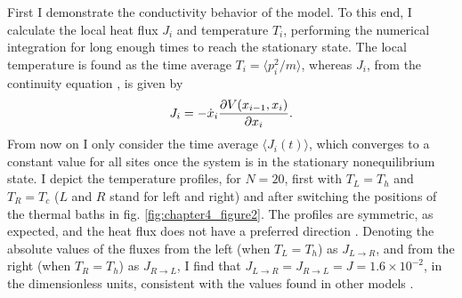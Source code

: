 First I demonstrate the conductivity behavior of the model.
To this end, I calculate the local heat flux $J_i$ and temperature $T_i$, performing the numerical integration
for long enough times to reach the stationary state.
The local temperature is found as the time average $T_i= \langle p_i^2 / m \rangle$, whereas
$J_i$,  from the continuity equation
\cite{Hu1998}, is given by
%
\begin{equation}
\label{heatflux}
J_i=-\dot x_i {{\partial V(x_{i-1},x_{i})} \over {\partial x_i}}.
\end{equation}
%
From now on I only consider the time average $\langle J_i (t)\rangle$, which converges to a constant value for all sites once the system is in the stationary nonequilibrium state. I depict the temperature profiles, for $N=20$, first with $T_L=T_h$ and $T_R=T_c$
($L$ and $R$ stand for left and right) and after switching the positions of the thermal baths in fig. \ref{fig:chapter4_figure2}. The profiles are symmetric, as expected, and the heat flux does not have a preferred direction  \cite{Hu1998,Terraneo2002}. Denoting the absolute values of the fluxes from the left (when $T_L=T_h$) as
$J_{L\rightarrow R}$, and from the right (when $T_R=T_h$) as
$J_{R\rightarrow L}$, I find that $J_{L\rightarrow R}=J_{R\rightarrow L}=J=1.6\times 10^{-2}$, in the dimensionless units, consistent with the values found in other models \cite{Terraneo2002,Hu1998}.

